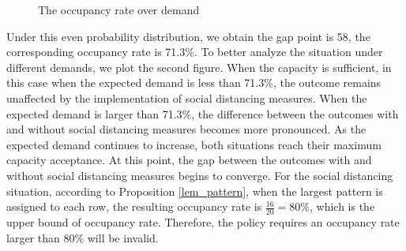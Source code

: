 \begin{figure}[h]
  \centering
  \caption{The occupancy rate over demand}
  \label{Fig.lable}
\end{figure}

Under this even probability distribution, we obtain the gap point is 58, the corresponding occupancy rate is 71.3\%. To better analyze the situation under different demands, we plot the second figure. When the capacity is sufficient, in this case when the expected demand is less than 71.3\%, the outcome remains unaffected by the implementation of social distancing measures. When the expected demand is larger than 71.3\%, the difference between the outcomes with and without social distancing measures becomes more pronounced. As the expected demand continues to increase, both situations reach their maximum capacity acceptance. At this point, the gap between the outcomes with and without social distancing measures begins to converge. For the social distancing situation, according to Proposition \ref{lem_pattern}, when the largest pattern is assigned to each row, the resulting occupancy rate is $\frac{16}{20} = 80\%$, which is the upper bound of occupancy rate. Therefore, the policy requires an occupancy rate larger than 80\% will be invalid.

